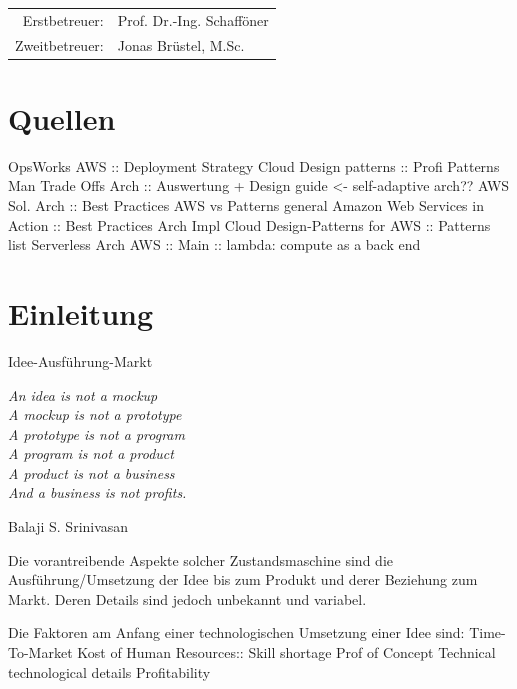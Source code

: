 \documentclass[
12pt,
english,
ngerman,
headsepline,
twoside,
openright,
numbers=noenddot,version=first
]{scrreprt}
\providecommand{\tabularnewline}{\\}
\let\myTOC\tableofcontents
\renewcommand\tableofcontents{
    \begin{spacing}{1.1}
    \myTOC
    \end{spacing}
    \clearpage
    \pagenumbering{arabic}
}
\begin{document}
\vspace{1cm}

\noindent \begin{center}
\medskip{}
\begin{tabular}{rl}
Erstbetreuer: & Prof. Dr.-Ing. Schafföner\tabularnewline
Zweitbetreuer: & Jonas Brüstel, M.Sc.\tabularnewline
\end{tabular}
\par\end{center}

\noindent \begin{center}
{\huge }
\par\end{center}{\huge \par}

\newpage{}

%
\tableofcontents{}

\pagestyle{scrheadings}   

\chapter{Quellen}
OpsWorks AWS :: Deployment Strategy
Cloud Design patterns :: Profi Patterns
Man Trade Offs Arch :: Auswertung + Design guide  <- self-adaptive arch?? 
AWS Sol. Arch :: Best Practices AWS vs Patterns general 
Amazon Web Services in Action :: Best Practices Arch
Impl Cloud Design-Patterns for AWS :: Patterns list
Serverless Arch AWS :: Main :: lambda: compute as a back end 


\chapter{Einleitung}{Idee-Ausführung-Markt}
\setcounter{page}{1}
\label{chap:introduction}
\epigraph{\textit{\textquotedbl{}
		An idea is not a mockup\\
		A mockup is not a prototype\\
		A prototype is not a program\\
		A program is not a product\\
		A product is not a business\\
		And a business is not profits.\textquotedbl{}}}{
	Balaji S. Srinivasan }


Die vorantreibende Aspekte solcher Zustandsmaschine sind die Ausführung/Umsetzung der Idee bis zum Produkt und derer Beziehung zum Markt. Deren Details sind jedoch unbekannt und variabel. 

Die Faktoren am Anfang einer technologischen Umsetzung einer Idee sind: 
Time-To-Market
Kost of Human Resources:: Skill shortage
Prof of Concept
Technical technological details
Profitability
\end{document}
